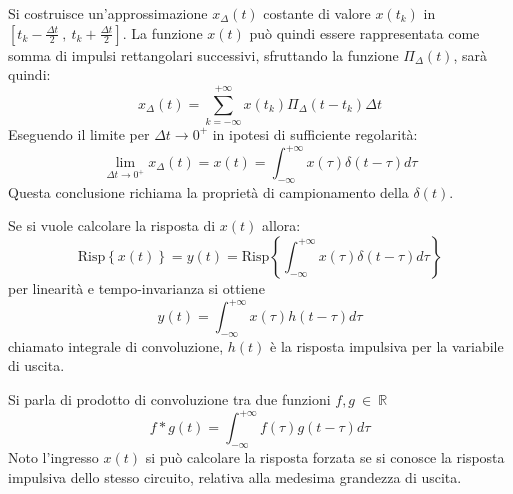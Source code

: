 Si costruisce un'approssimazione $x_\Delta(t)$ costante di valore $x(t_k)$ in $\left[t_k-\frac{\Delta t}{2}\ ,\ 
t_k+\frac{\Delta t}{2}\right]$.
La funzione $x(t)$ può quindi essere rappresentata come somma di impulsi rettangolari successivi,
sfruttando la funzione $\Pi_{\Delta}(t)$, sarà quindi:
$$
x_{\Delta}(t) = \sum_{k = -\infty}^{+\infty} x(t_k) \Pi_\Delta(t-t_k)\Delta t
$$
Eseguendo il limite per $\Delta t \rightarrow 0^+$ in ipotesi di sufficiente regolarità:
$$
\lim_{\Delta t \to 0^+} x_\Delta(t) = x(t) = \int_{-\infty}^{+\infty} x(\tau) \delta (t-\tau)
d\tau
$$
Questa conclusione richiama la proprietà di campionamento della $\delta(t)$.

Se si vuole calcolare la risposta di $x(t)$ allora:
$$
\text{Risp}\left\{x(t)\right\} = y(t) = \text{Risp} \left\{\int_{-\infty}^{+\infty} x(\tau)\delta(t-\tau)
d\tau\right\}
$$
per linearità e tempo-invarianza si ottiene
$$
y(t) = \int_{-\infty}^{+\infty} x(\tau)h(t-\tau) d\tau
$$
chiamato integrale di convoluzione, $h(t)$ è la risposta impulsiva per la variabile di uscita.

Si parla di prodotto di convoluzione tra due funzioni $f,g \ \in\ \mathbb{R}$
$$
f * g(t) = \int_{-\infty}^{+\infty} f(\tau)g(t-\tau)d\tau
$$
Noto l'ingresso $x(t)$ si può calcolare la risposta forzata se si conosce la risposta impulsiva
dello stesso circuito, relativa alla medesima grandezza di uscita.
